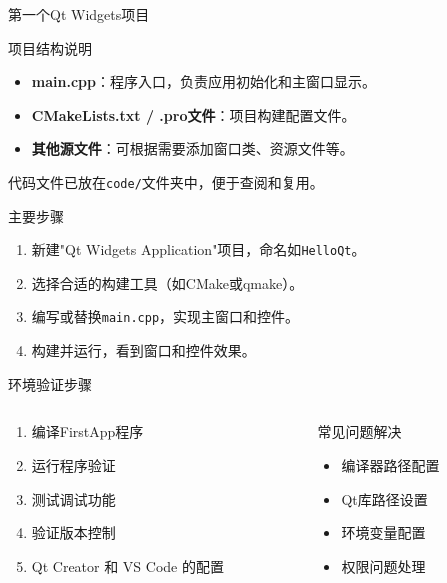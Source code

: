 \documentclass[UTF8,aspectratio=169]{beamer}
\begin{document}
\begin{frame}{第一个Qt Widgets项目}
    \begin{ytublock}{项目结构说明}
        \begin{itemize}
            \item \textbf{main.cpp}：程序入口，负责应用初始化和主窗口显示。
            \item \textbf{CMakeLists.txt / .pro文件}：项目构建配置文件。
            \item \textbf{其他源文件}：可根据需要添加窗口类、资源文件等。
        \end{itemize}
        代码文件已放在\texttt{code/}文件夹中，便于查阅和复用。
    \end{ytublock}
    \begin{ytublock}{主要步骤}
        \begin{enumerate}
            \item 新建"Qt Widgets Application"项目，命名如\texttt{HelloQt}。
            \item 选择合适的构建工具（如CMake或qmake）。
            \item 编写或替换\texttt{main.cpp}，实现主窗口和控件。
            \item 构建并运行，看到窗口和控件效果。
        \end{enumerate}
    \end{ytublock}
\end{frame}

\begin{frame}{环境验证步骤}
    \begin{columns}
        \begin{column}{0.58\textwidth}
            \begin{enumerate}
                \item 编译FirstApp程序
                \item 运行程序验证
                \item 测试调试功能
                \item 验证版本控制
                \item Qt Creator 和 VS Code 的配置
            \end{enumerate}
        \end{column}
        \hspace{0.02\textwidth}
        \begin{column}{0.38\textwidth}
            \begin{ytublock}{常见问题解决}
                \begin{itemize}
                    \item 编译器路径配置
                    \item Qt库路径设置
                    \item 环境变量配置
                    \item 权限问题处理
                \end{itemize}
            \end{ytublock}
        \end{column}
    \end{columns}
\end{frame}
\end{document}
